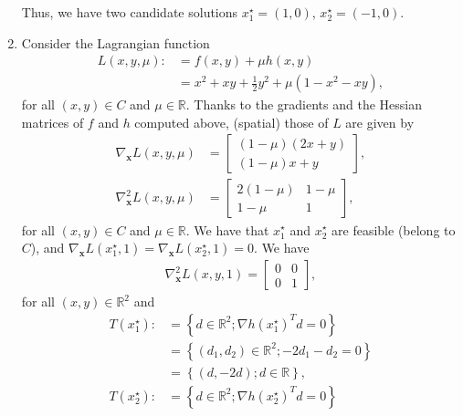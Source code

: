 \documentclass[a4paper]{article}
\numberwithin{equation}{section}
\begin{document}
\begin{enumerate}
Thus, we have two candidate solutions $x_1^\star = \left(1,0\right)$, $x_2^\star =\left(-1,0\right)$.
\item Consider the Lagrangian function 
\begin{align}
L\left( {x,y,\mu } \right): &= f\left( {x,y} \right) + \mu h\left( {x,y} \right)\\
& = {x^2} + xy + \frac{1}{2}{y^2} + \mu \left( {1 - {x^2} - xy} \right),
\end{align}
for all $\left(x,y\right)\in C$ and $\mu \in \mathbb{R}$. Thanks to the gradients and the Hessian matrices of $f$ and $h$ computed above, (spatial) those of $L$ are given by
\begin{align}
{\nabla _\mathbf{x}}L\left( {x,y,\mu } \right) &= \left[ {\begin{array}{*{20}{c}}
{\left( {1 - \mu } \right)\left( {2x + y} \right)}\\
{\left( {1 - \mu } \right)x + y}
\end{array}} \right],\\
\nabla _\mathbf{x}^2L\left( {x,y,\mu } \right) &= \left[ {\begin{array}{*{20}{c}}
{2\left( {1 - \mu } \right)}&{1 - \mu }\\
{1 - \mu }&1
\end{array}} \right],
\end{align}
for all $\left(x,y\right)\in C$ and $\mu \in \mathbb{R}$. We have that $x_1^\star$ and $x_2^\star$ are feasible (belong to $C$), and ${\nabla _\mathbf{x}}L\left( {x_1^\star ,1} \right) = {\nabla _\mathbf{x}}L\left( {x_2^\star ,1} \right) = 0$. We have 
\begin{align}
\nabla _\mathbf{x}^2L\left( {x,y,1} \right) = \left[ {\begin{array}{*{20}{c}}
0&0\\
0&1
\end{array}} \right],
\end{align}
for all $\left(x,y\right)\in \mathbb{R}^2$ and
\begin{align}
T\left( {x_1^\star } \right): &= \left\{ {d \in {\mathbb{R}^2};\nabla h{{\left( {x_1^\star } \right)}^T}d = 0} \right\}\\
 &= \left\{ {\left( {{d_1},{d_2}} \right) \in {\mathbb{R}^2}; - 2{d_1} - {d_2} = 0} \right\}\\
 &= \left\{ {\left( {d, - 2d} \right);d \in \mathbb{R}} \right\},\\
T\left( {x_2^\star } \right): &= \left\{ {d \in {\mathbb{R}^2};\nabla h{{\left( {x_2^\star } \right)}^T}d = 0} \right\}\\

\end{align}
\end{enumerate}
\end{document}

